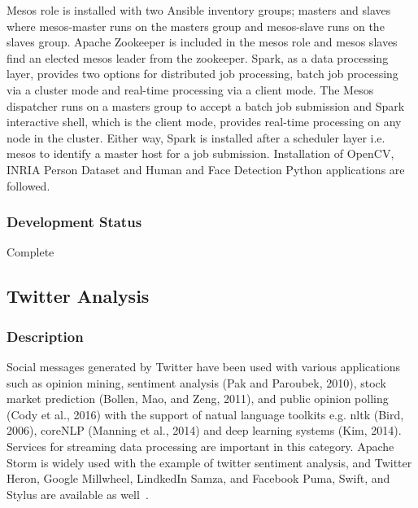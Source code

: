 \documentclass[9pt,twocolumn,twoside]{styles/osajnl}
\begin{document}
\begin{table}[htb]
Mesos role is installed with two Ansible inventory groups; masters and
slaves where mesos-master runs on the masters group and mesos-slave
runs on the slaves group. Apache Zookeeper is included in the mesos
role and mesos slaves find an elected mesos leader from the
zookeeper. Spark, as a data processing layer, provides two options for
distributed job processing, batch job processing via a cluster mode
and real-time processing via a client mode. The Mesos dispatcher runs
on a masters group to accept a batch job submission and Spark
interactive shell, which is the client mode, provides real-time
processing on any node in the cluster. Either way, Spark is installed
after a scheduler layer i.e. mesos to identify a master host for a job
submission. Installation of OpenCV, INRIA Person Dataset and Human and
Face Detection Python applications are followed.

\subsubsection{Development Status}

Complete



\subsection{Twitter Analysis}

\subsubsection{Description}

Social messages generated by Twitter have been used with various
applications such as opinion mining, sentiment analysis (Pak and
Paroubek, 2010), stock market prediction (Bollen, Mao, and Zeng,
2011), and public opinion polling (Cody et al., 2016) with the support
of natual language toolkits e.g. nltk (Bird, 2006), coreNLP (Manning
et al., 2014) and deep learning systems (Kim, 2014). Services for
streaming data processing are important in this category. Apache Storm
is widely used with the example of twitter sentiment analysis, and
Twitter Heron, Google Millwheel, LindkedIn Samza, and Facebook Puma,
Swift, and Stylus are available as well~\cite{chen2016realtime}.


\end{table}
\end{document}
